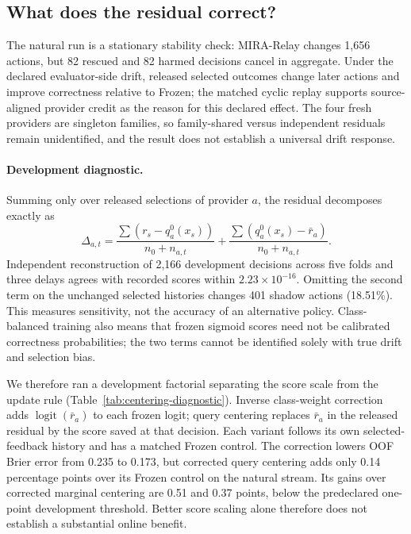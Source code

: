 \documentclass[sigconf,anonymous]{aamas}
\begin{document}
\subsection{What does the residual correct?}
The natural run is a stationary stability check: MIRA-Relay changes 1,656 actions, but 82 rescued and 82 harmed decisions cancel in aggregate. Under the declared evaluator-side drift, released selected outcomes change later actions and improve correctness relative to Frozen; the matched cyclic replay supports source-aligned provider credit as the reason for this declared effect. The four fresh providers are singleton families, so family-shared versus independent residuals remain unidentified, and the result does not establish a universal drift response.

\paragraph{Development diagnostic.}
Summing only over released selections of provider $a$, the residual decomposes exactly as
\begin{equation}
\Delta_{a,t}=\frac{\sum(r_s-q_a^0(x_s))}{n_0+n_{a,t}}
            +\frac{\sum(q_a^0(x_s)-\bar r_a)}{n_0+n_{a,t}}.
\end{equation}
Independent reconstruction of 2,166 development decisions across five folds and three delays agrees with recorded scores within $2.23\times10^{-16}$. Omitting the second term on the unchanged selected histories changes 401 shadow actions (18.51\%). This measures sensitivity, not the accuracy of an alternative policy. Class-balanced training also means that frozen sigmoid scores need not be calibrated correctness probabilities; the two terms cannot be identified solely with true drift and selection bias.

We therefore ran a development factorial separating the score scale from the update rule (Table~\ref{tab:centering-diagnostic}). Inverse class-weight correction adds $\operatorname{logit}(\bar r_a)$ to each frozen logit; query centering replaces $\bar r_a$ in the released residual by the score saved at that decision. Each variant follows its own selected-feedback history and has a matched Frozen control. The correction lowers OOF Brier error from 0.235 to 0.173, but corrected query centering adds only 0.14 percentage points over its Frozen control on the natural stream. Its gains over corrected marginal centering are 0.51 and 0.37 points, below the predeclared one-point development threshold. Better score scaling alone therefore does not establish a substantial online benefit.
\end{document}
